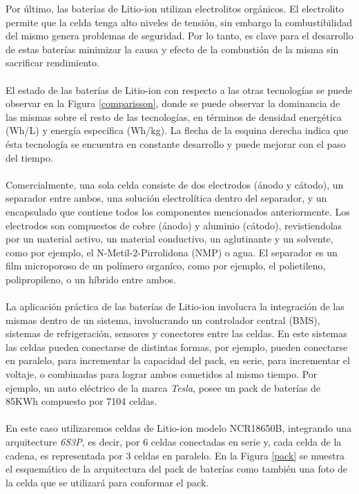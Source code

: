\documentclass[10pt,a4paper]{article}
\begin{document}
	\noindent Por último, las baterías de Litio-ion utilizan electrolitos orgánicos. El electrolito permite que la celda tenga alto niveles de tensión, sin embargo la combustibilidad del mismo genera problemas de seguridad. Por lo tanto, es clave para el desarrollo de estas baterías minimizar la causa y efecto de la combustión de la misma sin sacrificar rendimiento.\\
	\\
	\noindent El estado de las baterías de Litio-ion con respecto a las otras tecnologías se puede observar en la Figura \ref{comparisson}, donde se puede observar la dominancia de las mismas sobre el resto de las tecnologías, en términos de densidad energética (Wh/L) y energía específica (Wh/kg). La flecha de la esquina derecha indica que ésta tecnología se encuentra en constante desarrollo y puede mejorar con el paso del tiempo.\\
	\\
	\noindent Comercialmente, una sola celda consiste de dos electrodos (ánodo y cátodo), un separador entre ambos, una solución electrolítica dentro del separador, y un encapsulado que contiene todos los componentes mencionados anteriormente. Los electrodos son compuestos de cobre (ánodo) y aluminio (cátodo), revistiendolas por un material activo, un material conductivo, un aglutinante y un solvente, como por ejemplo, el N-Metil-2-Pirrolidona (NMP) o agua. El separador es un film microporoso de un polímero organíco, como por ejemplo, el polietileno, polipropileno, o un híbrido entre ambos.\\
	\\
	\noindent La aplicación práctica de las baterías de Litio-ion involucra la integración de las mismas dentro de un sistema, involucrando un controlador central (BMS), sistemas de refrigeración, sensores y conectores entre las celdas. En este sistemas las celdas pueden conectarse de distintas formas, por ejemplo, pueden conectarse en paralelo, para incrementar la capacidad del pack, en serie, para incrementar el voltaje, o combinadas para lograr ambos cometidos al mismo tiempo. Por ejemplo, un auto eléctrico de la marca \emph{Tesla}, posee un pack de baterías de 85KWh compuesto por 7104 celdas.\\
	\\
	\noindent En este caso utilizaremos celdas de Litio-ion modelo NCR18650B, integrando una arquitecture \emph{6S3P}, es decir, por 6 celdas conectadas en serie y, cada celda de la cadena, es representada por 3 celdas en paralelo. En la Figura \ref{pack} se muestra el esquemático de la arquitectura del pack de baterías como también una foto de la celda que se utilizará para conformar el pack. 
	
\end{document}
